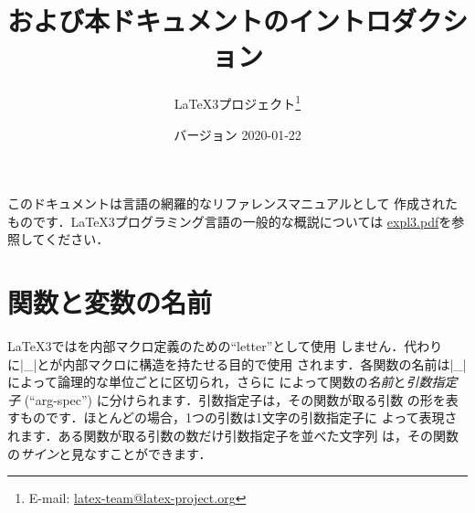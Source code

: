 \documentclass[uplatex,dvipdfmx,full,kernel]{wtpl3doc}
\begin{document}
\title{および本ドキュメントのイントロダクション}
\author{%
 \LaTeX3プロジェクト\thanks
   {%
     E-mail:
       \href{mailto:latex-team@latex-project.org}
         {latex-team@latex-project.org}%
   }%
}
\date{バージョン 2020-01-22}

\maketitle

このドキュメントは言語の網羅的なリファレンスマニュアルとして
作成されたものです．\LaTeX3プログラミング言語の一般的な概説については
\href{expl3.pdf}{expl3.pdf}を参照してください．

\section{関数と変数の名前}

\LaTeX3ではを内部マクロ定義のための\enquote{letter}として使用
しません．代わりに|_|と\code{:}が内部マクロに構造を持たせる目的で使用
されます．各関数の名前は|_|によって論理的な単位ごとに区切られ，さらに
\code{:}によって関数の\emph{名前}と\emph{引数指定子}
(\enquote{arg-spec}) に分けられます．引数指定子は，その関数が取る引数
の形を表すものです．ほとんどの場合，1つの引数は1文字の引数指定子に
よって表現されます．ある関数が取る引数の数だけ引数指定子を並べた文字列
は，その関数の\emph{サイン}と見なすことができます．
\end{document}
